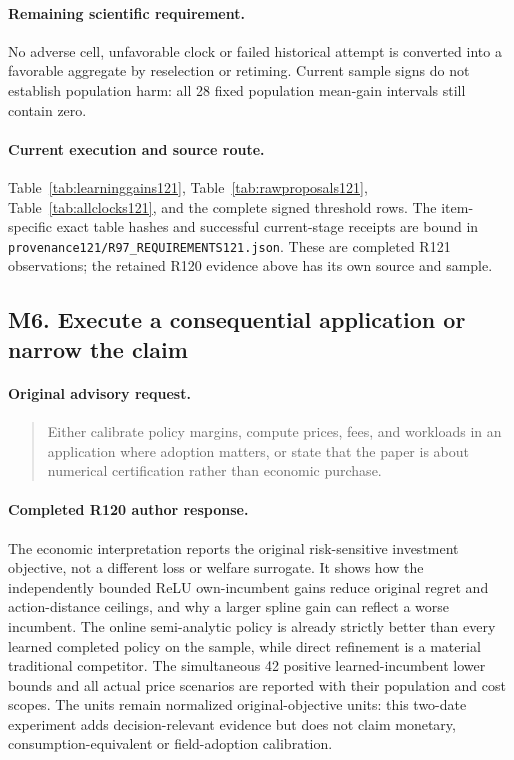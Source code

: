 \paragraph{Remaining scientific requirement.}
No adverse cell, unfavorable clock or failed historical attempt is converted into a favorable aggregate by reselection or retiming. Current sample signs do not establish population harm: all 28 fixed population mean-gain intervals still contain zero.

\paragraph{Current execution and source route.}
Table~\ref{tab:learninggains121}, Table~\ref{tab:rawproposals121}, Table~\ref{tab:allclocks121}, and the complete signed threshold rows.
The item-specific exact table hashes and successful current-stage receipts are bound in \nolinkurl{provenance121/R97_REQUIREMENTS121.json}. These are completed R121 observations; the retained R120 evidence above has its own source and sample.

\subsection{M6. Execute a consequential application or narrow the claim}
\label{response121:M6}

\paragraph{Original advisory request.}
\begin{quote}
Either calibrate policy margins, compute prices, fees, and workloads in an application where adoption matters, or state that the paper is about numerical certification rather than economic purchase.
\end{quote}

\paragraph{Completed R120 author response.}
The economic interpretation reports the original risk-sensitive investment objective, not a different loss or welfare surrogate. It shows how the independently bounded ReLU own-incumbent gains reduce original regret and action-distance ceilings, and why a larger spline gain can reflect a worse incumbent. The online semi-analytic policy is already strictly better than every learned completed policy on the sample, while direct refinement is a material traditional competitor. The simultaneous 42 positive learned-incumbent lower bounds and all actual price scenarios are reported with their population and cost scopes. The units remain normalized original-objective units: this two-date experiment adds decision-relevant evidence but does not claim monetary, consumption-equivalent or field-adoption calibration.

